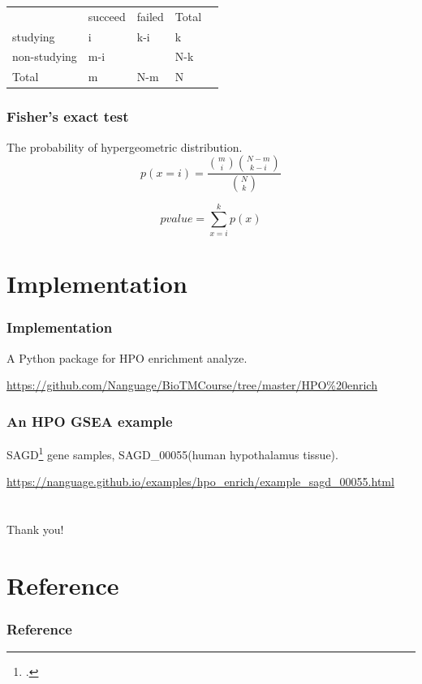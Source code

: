 \documentclass{beamer}
\begin{document}
\begin{frame}

    \begin{table}[]
    \begin{tabular}{lllll}
                 & succeed & failed & Total &  \\
    studying     & i       & k-i    & k     &  \\
    non-studying & m-i     &        & N-k   &  \\
    Total        & m       & N-m    & N     & 
    \end{tabular}
    \end{table}

    \frametitle{Fisher's exact test}
    The probability of hypergeometric distribution.
    \begin{equation}
        p(x=i) = \frac{ {m \choose i} { {N-m} \choose {k-i} } }{{N \choose k}}
    \end{equation}

    \begin{equation}
        pvalue = \sum_{x=i}^{k}{p(x)}
    \end{equation}
    

\end{frame}

\section{Implementation}

\begin{frame}
    \frametitle{Implementation}
    A Python package for HPO enrichment analyze.

    \small{
    \url{https://github.com/Nanguage/BioTMCourse/tree/master/HPO\%20enrich}
    }
    
\end{frame}

\begin{frame}
    \frametitle{An HPO GSEA example}

    SAGD\footcite{shi2018sagd} gene samples, SAGD\_00055(human hypothalamus tissue).

    \tiny{
    \url{https://nanguage.github.io/examples/hpo_enrich/example_sagd_00055.html}
    }
\end{frame}

\section{}

\begin{frame}
    Thank you!
\end{frame}

\section{Reference}
\begin{frame}
    \frametitle{Reference}
    \def\bibfont{\tiny}
    \printbibliography
\end{frame}
\end{document}
